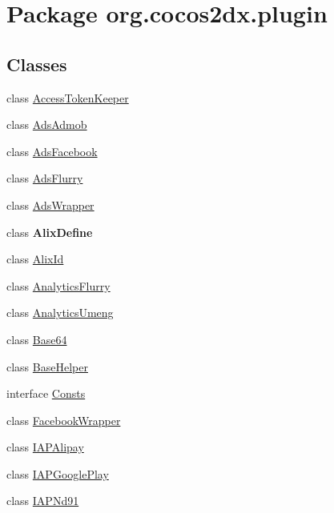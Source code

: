 \hypertarget{namespaceorg_1_1cocos2dx_1_1plugin}{}\section{Package org.\+cocos2dx.\+plugin}
\label{namespaceorg_1_1cocos2dx_1_1plugin}
\subsection*{Classes}
\begin{DoxyCompactItemize}
\item 
class \hyperlink{classorg_1_1cocos2dx_1_1plugin_1_1AccessTokenKeeper}{Access\+Token\+Keeper}
\item 
class \hyperlink{classorg_1_1cocos2dx_1_1plugin_1_1AdsAdmob}{Ads\+Admob}
\item 
class \hyperlink{classorg_1_1cocos2dx_1_1plugin_1_1AdsFacebook}{Ads\+Facebook}
\item 
class \hyperlink{classorg_1_1cocos2dx_1_1plugin_1_1AdsFlurry}{Ads\+Flurry}
\item 
class \hyperlink{classorg_1_1cocos2dx_1_1plugin_1_1AdsWrapper}{Ads\+Wrapper}
\item 
class {\bfseries Alix\+Define}
\item 
class \hyperlink{classorg_1_1cocos2dx_1_1plugin_1_1AlixId}{Alix\+Id}
\item 
class \hyperlink{classorg_1_1cocos2dx_1_1plugin_1_1AnalyticsFlurry}{Analytics\+Flurry}
\item 
class \hyperlink{classorg_1_1cocos2dx_1_1plugin_1_1AnalyticsUmeng}{Analytics\+Umeng}
\item 
class \hyperlink{classorg_1_1cocos2dx_1_1plugin_1_1Base64}{Base64}
\item 
class \hyperlink{classorg_1_1cocos2dx_1_1plugin_1_1BaseHelper}{Base\+Helper}
\item 
interface \hyperlink{interfaceorg_1_1cocos2dx_1_1plugin_1_1Consts}{Consts}
\item 
class \hyperlink{classorg_1_1cocos2dx_1_1plugin_1_1FacebookWrapper}{Facebook\+Wrapper}
\item 
class \hyperlink{classorg_1_1cocos2dx_1_1plugin_1_1IAPAlipay}{I\+A\+P\+Alipay}
\item 
class \hyperlink{classorg_1_1cocos2dx_1_1plugin_1_1IAPGooglePlay}{I\+A\+P\+Google\+Play}
\item 
class \hyperlink{classorg_1_1cocos2dx_1_1plugin_1_1IAPNd91}{I\+A\+P\+Nd91}
\item 

\end{DoxyCompactItemize}
